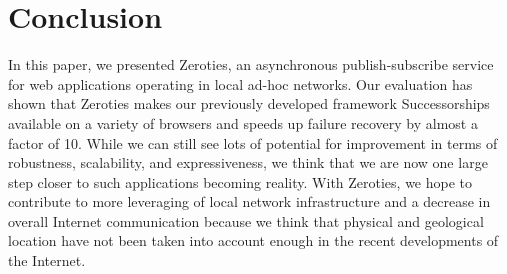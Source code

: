 \section{Conclusion}
\label{sec:conclusion}

In this paper, we presented Zeroties, an asynchronous publish-subscribe service for web applications operating in local ad-hoc networks. 
Our evaluation has shown that Zeroties makes our previously developed framework Successorships available on a variety of browsers and speeds up failure recovery by almost a factor of 10.
While we can still see lots of potential for improvement in terms of robustness, scalability, and expressiveness, we think that we are now one large step closer to such applications becoming reality.
With Zeroties, we hope to contribute to more leveraging of local network infrastructure and a decrease in overall Internet communication because we think that physical and geological location have not been taken into account enough in the recent developments of the Internet.